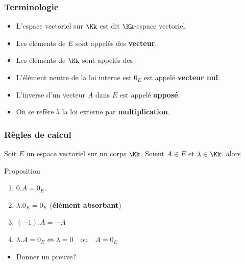 \documentclass[dvipsnames]{beamer}
\begin{document}
\begin{frame}[<+->]
  \frametitle{Terminologie}
  \begin{itemize}
    \item L'espace vectoriel sur $\Kk$ est dit
      \alert{$\Kk$-espace vectoriel}.\\[4pt]
    \item Les éléments de $E$ sont appelés des
      \textbf{\alert{vecteur}}.\\[4pt]

    \item Les éléments de $\Kk$ sont appelés des
      \textbf{}.\\[4pt]
    \item L'élément neutre de la loi interne est $0_E$ est appelé
      \textbf{\alert{vecteur nul}}.\\[4pt]
    \item L'inverse d'un vecteur $A$ dans $E$ est appelé
      \textbf{\alert{opposé}}.\\[4pt]
    \item On se refère à la loi externe par
      \textbf{multiplication}.
  \end{itemize} 
\end{frame}
\begin{frame}[<+->]
  \frametitle{Règles de calcul}
 Soit $E$ un espace vectoriel sur un corps $\Kk$. Soient $A\in E$ et
 $\lambda\in \Kk$. alors\\[6pt]
  \begin{block}{Proposition}
    \begin{enumerate}
      \small
    \item $0 . A = 0_E$.\\[8pt]

    \item $\lambda.0_E = 0_E$
      (\textbf{\alert{élément absorbant}})\\[8pt]
    \item $(-1).A = -A$ \\[8pt]
    \item $\lambda.A = 0_E \iff \lambda =0 \quad \text{ou}\quad
        A=0_E$
    \end{enumerate}
  \end{block}
  \begin{itemize}
    \item Donner un preuve?
  \end{itemize}
\end{frame}
\end{document}
